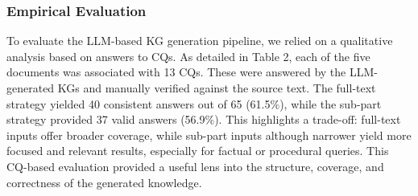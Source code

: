 \documentclass[runningheads]{llncs}
\begin{document}
\begin{table}[t]
\centering
\caption{Score CQs answering of Large Language Models Approach.}\label{tab1}
\end{table}

\subsubsection{Empirical Evaluation}
To evaluate the LLM-based KG generation pipeline, we relied on a qualitative analysis based on answers to CQs. As detailed in Table 2, each of the five documents was associated with 13 CQs. These were answered by the LLM-generated KGs and manually verified against the source text. The full-text strategy yielded 40 consistent answers out of 65 (61.5\%), while the sub-part strategy provided 37 valid answers (56.9\%). This highlights a trade-off: full-text inputs offer broader coverage, while sub-part inputs although narrower yield more focused and relevant results, especially for factual or procedural queries. This CQ-based evaluation provided a useful lens into the structure, coverage, and correctness of the generated knowledge.
\end{document}
